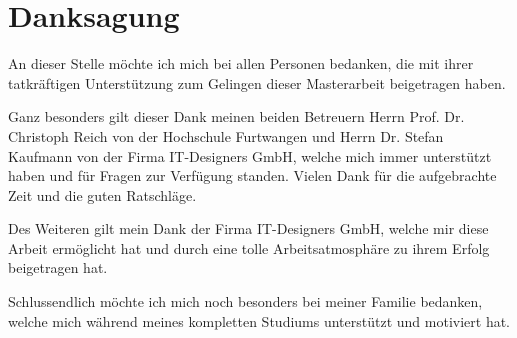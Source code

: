 
\chapter*{Danksagung} %

An dieser Stelle möchte ich mich bei allen Personen bedanken, die mit ihrer tatkräftigen Unterstützung zum
Gelingen dieser Masterarbeit beigetragen haben.

Ganz besonders gilt dieser Dank meinen beiden Betreuern Herrn Prof. Dr. Christoph Reich von
der Hochschule Furtwangen und Herrn Dr. Stefan Kaufmann von der Firma IT-Designers GmbH, welche
mich immer unterstützt haben und für Fragen zur Verfügung standen.
Vielen Dank für die aufgebrachte Zeit und die guten Ratschläge.

Des Weiteren gilt mein Dank der Firma IT-Designers GmbH, welche mir diese Arbeit ermöglicht hat und durch eine
tolle Arbeitsatmosphäre zu ihrem Erfolg beigetragen hat.

Schlussendlich möchte ich mich noch besonders bei meiner Familie bedanken, welche mich während meines
kompletten Studiums unterstützt und motiviert hat.